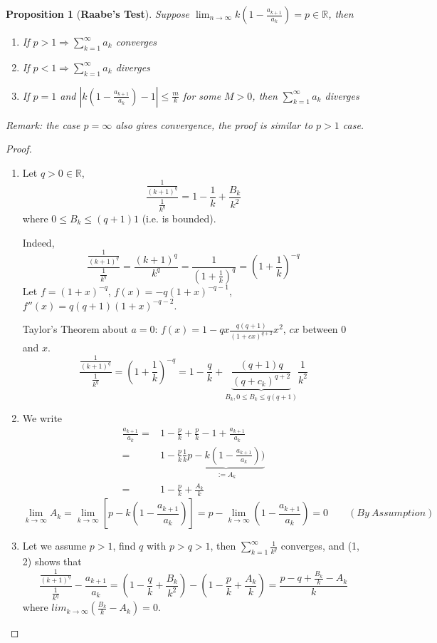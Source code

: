 \documentclass[12pt]{article}
\theoremstyle{plain}
\newtheorem{proposition}{Proposition}[subsection]
\newcommand{\abs}[1]{\left| #1 \right|}
\newcommand{\mR}{{\mathbb{R}}}
\begin{document}
\begin{proposition}[\textbf{Raabe's Test}]
	Suppose $\lim_{n\to\infty} k (1-\frac{a_{k+1}}{a_k}) = p \in \mR$,
	then 
	\begin{enumerate}
		\item If $p > 1 \Rightarrow \sum_{k=1}^{\infty} a_k$ converges
		\item If $p < 1 \Rightarrow \sum_{k=1}^{\infty} a_k$ diverges
		\item If $p = 1$ and $\abs{k(1-\frac{a_{k+1}}{a_k})-1}\leq \frac mk$ 
			for some $M>0$, then $\sum_{k=1}^{\infty} a_k$ diverges
	\end{enumerate}
	\textit{Remark:} the case $p = \infty$ also gives convergence, the proof is
	similar to $p > 1$ case. 
\end{proposition}
\begin{proof}
	$ $
\begin{enumerate}
\item 
	Let $q>0 \in \mR$, 
	\[
		\frac{\frac 1{(k+1)^q}}{\frac 1{k^q}} = 1-\frac 1k + \frac{B_k}{k^2}
	\]
	where $0 \leq B_k \leq (q+1)1$ (i.e. is bounded).

	Indeed, 
	\[
		\frac{\frac 1{(k+1)^q}}{\frac 1{k^q}} = 
		\frac{(k+1)^q}{k^q}
		= \frac1{(1+\frac1k)^q}
		= (1+\frac 1k)^{-q}
	\]
	Let $f = (1+x)^{-q}$, $f(x) = -q(1+x)^{-q-1}$, $f''(x) = q(q+1)(1+x)^{-q-2}$.

	Taylor's Theorem about $a = 0$: $f(x) = 1-qx \frac{q(q+1)}{(1+cx)^{q+2}}x^2$,
	$cx$ between $0$ and $x$.
	\[
		\frac{\frac 1{(k+1)^q}}{\frac 1{k^q}} 
		= (1+\frac 1k)^{-q}
		= 1- \frac qk + 
		\underbrace{\frac{(q+1)q}{(q+c_k)^{q+2}}}_{B_k, 0\leq B_k \leq q(q+1)}
		\frac 1{k^2} 
	\]

\item
	We write 
	\begin{align*}
		\frac{a_{k+1}}{a_k} 
		=& 1-\frac pk + \frac pk - 1 + \frac{a_{k+1}}{a_k}	\\
	=& 1- \frac pk \frac 1k \underbrace{p-k(1-\frac {a_{k+1}}{a_k}))}_{:=A_k}\\
	=& 1- \frac pk + \frac{A_k}k
	\end{align*}
\[
	\lim_{k\to\infty} A_k = \lim_{k\to\infty} [p-k(1-\frac{a_{k+1}}{a_k})]
	= p - \lim_{k\to\infty} (1-\frac{a_{k+1}}{a_k}) = 0 
	\qquad (By \ Assumption)
\]

\item Let we assume $p > 1$, find $q$ with $p > q > 1$, then 
	$\sum_{k=1}^{\infty} \frac1{k^q}$ converges, and (1, 2) shows that 
	\[
		\frac{\frac 1{(k+1)^q}}{\frac 1{k^q}} - \frac{a_{k+1}}{a_k}
		 = (1-\frac qk + \frac{B_k}{k^2}) - (1-\frac pk + \frac{A_k}k)
		 = \frac{p-q+\frac{B_k}k - A_k}k
	\]
	where $lim_{k\to\infty}(\frac{B_k}k - A_k)=0$.
	

\end{enumerate}
\end{proof}
\end{document}
